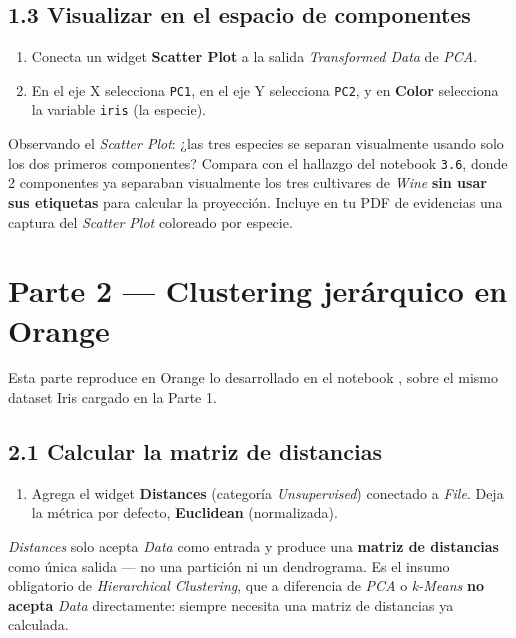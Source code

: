 \documentclass[11pt,letterpaper]{article}
\begin{document}
\subsection{1.3 Visualizar en el espacio de componentes}

\begin{enumerate}[leftmargin=1.2cm]
  \item Conecta un widget \textbf{Scatter Plot} a la salida \textit{Transformed Data} de \textit{PCA}.
  \item En el eje X selecciona \texttt{PC1}, en el eje Y selecciona \texttt{PC2}, y en \textbf{Color} selecciona la variable \texttt{iris} (la especie).
\end{enumerate}

\begin{actividad}
Observando el \textit{Scatter Plot}: ¿las tres especies se separan visualmente usando solo los dos primeros componentes? Compara con el hallazgo del notebook \texttt{3.6}, donde 2 componentes ya separaban visualmente los tres cultivares de \textit{Wine} \textbf{sin usar sus etiquetas} para calcular la proyección. Incluye en tu PDF de evidencias una captura del \textit{Scatter Plot} coloreado por especie.
\end{actividad}

\section{Parte 2 --- Clustering jerárquico en Orange}

Esta parte reproduce en Orange lo desarrollado en el notebook \texttt{}, sobre el mismo dataset Iris cargado en la Parte 1.

\subsection{2.1 Calcular la matriz de distancias}

\begin{enumerate}[leftmargin=1.2cm]
  \item Agrega el widget \textbf{Distances} (categoría \textit{Unsupervised}) conectado a \textit{File}. Deja la métrica por defecto, \textbf{Euclidean} (normalizada).
\end{enumerate}

\begin{nota}
\textit{Distances} solo acepta \textit{Data} como entrada y produce una \textbf{matriz de distancias} como única salida --- no una partición ni un dendrograma. Es el insumo obligatorio de \textit{Hierarchical Clustering}, que a diferencia de \textit{PCA} o \textit{k-Means} \textbf{no acepta} \textit{Data} directamente: siempre necesita una matriz de distancias ya calculada.
\end{nota}
\end{document}
